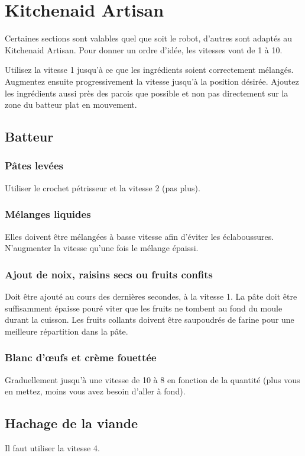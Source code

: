 \documentclass[a4paper,twoside,openright]{report}
\begin{document}
\section{Kitchenaid Artisan}
Certaines sections sont valables quel que soit le robot, d'autres sont adaptés au Kitchenaid Artisan. Pour donner un ordre 
d'idée, les vitesses vont de 1 à 10.

Utilisez la vitesse 1 jusqu'à ce que les ingrédients soient correctement mélangés. Augmentez ensuite progressivement la vitesse 
jusqu'à la position désirée. Ajoutez les ingrédients aussi près des parois que possible et non pas directement sur la zone du 
batteur plat en mouvement. 

\subsection{Batteur}
\subsubsection{Pâtes levées}
Utiliser le crochet pétrisseur et la vitesse 2 (pas plus). 

\subsubsection{Mélanges liquides}
Elles doivent être mélangées à basse vitesse afin d'éviter les éclaboussures. N'augmenter la vitesse qu'une fois le mélange 
épaissi. 

\subsubsection{Ajout de noix, raisins secs ou fruits confits}
Doit être ajouté au cours des dernières secondes, à la vitesse 1. La pâte doit être suffisamment épaisse pouré viter que les 
fruits ne tombent au fond du moule durant la cuisson. Les fruits collants doivent être saupoudrés de farine pour une meilleure 
répartition dans la pâte.

\subsubsection{Blanc d'œufs et crème fouettée}
Graduellement jusqu'à une vitesse de 10 à 8 en fonction de la quantité (plus vous en mettez, moins vous avez besoin d'aller à 
fond).

\subsection{Hachage de la viande}
Il faut utiliser la vitesse 4. 
\end{document}
